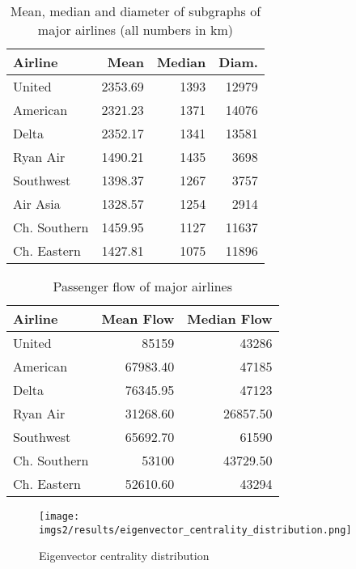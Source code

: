 \documentclass[twocolumn]{tum-article}
\begin{document}
\begin{table}[h]
\begin{center}
 \begin{tabular}{| l | r | r | r |}
 \hline
 \textbf{Airline} & \textbf{Mean} & \textbf{Median} & \textbf{Diam.} \\ 
 \hline
 United & 2353.69 & 1393 & 12979 \\
 \hline   
 American & 2321.23 & 1371 & 14076 \\
 \hline   
 Delta & 2352.17 & 1341 & 13581 \\
 \hline   
 Ryan Air & 1490.21 & 1435 & 3698 \\
 \hline   
 Southwest & 1398.37 & 1267 & 3757 \\
 \hline   
 Air Asia & 1328.57 & 1254 & 2914 \\
 \hline   
 Ch. Southern & 1459.95 & 1127 & 11637 \\
 \hline   
 Ch. Eastern & 1427.81 & 1075 & 11896 \\
 \hline
 \end{tabular}
\caption{Mean, median and diameter of subgraphs of major airlines (all numbers in km)}
\label{Tab:distance_airlines}
\end{center}
\end{table}

\begin{table}[h]
\begin{center}
 \begin{tabular}{| l | r | r |}
 \hline
 \textbf{Airline} & \textbf{Mean Flow} & \textbf{Median Flow} \\ 
 \hline
 United & 85159 & 43286 \\
 \hline
 American & 67983.40 & 47185 \\
 \hline
 Delta & 76345.95  & 47123 \\
 \hline
 Ryan Air & 31268.60 & 26857.50 \\
 \hline
 Southwest & 65692.70  & 61590 \\
 \hline
 Ch. Southern & 53100  & 43729.50 \\
 \hline
 Ch. Eastern & 52610.60  & 43294 \\
 \hline
 \end{tabular}
\caption{Passenger flow of major airlines}
\label{Tab:passenger_flow_airlines}
\end{center}
\end{table}

\begin{figure}
        \centering
        \texttt{[image: imgs2/results/eigenvector\_centrality\_distribution.png]}
        \caption{
Eigenvector centrality distribution}
        \label{fig:eigen_distr}
\end{figure}
\end{document}
